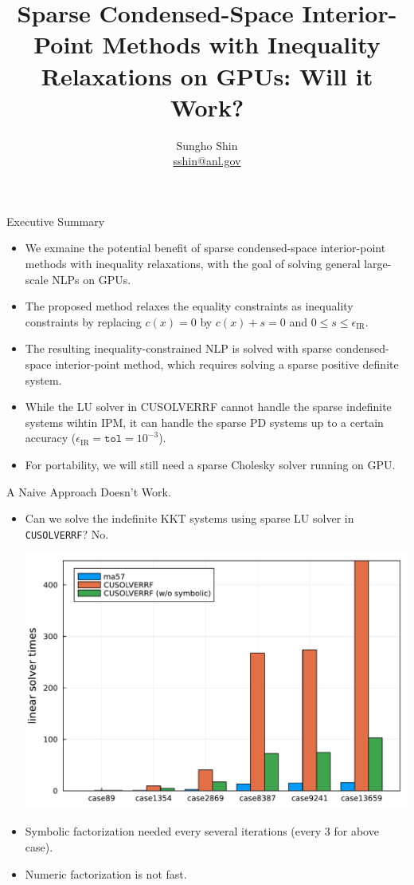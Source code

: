 % 

\title{{\bfseries Sparse Condensed-Space Interior-Point Methods with Inequality Relaxations on GPUs: Will it Work?}}

\graphicspath{}

\author[Sungho Shin]{
  Sungho Shin\\
  {\normalfont\footnotesize\url{sshin@anl.gov}}
}
\subtitle{}



{
}

\begin{frame}{Executive Summary}
  \begin{itemize}
  \item We exmaine the potential benefit of sparse condensed-space interior-point methods with inequality relaxations, with the goal of solving general large-scale NLPs on GPUs.
  \item The proposed method relaxes the equality constraints as inequality constraints by replacing $c(x) =0$ by $c(x)+ s=0$ and $0\leq s\leq\epsilon_{\text{IR}}$.
  \item The resulting inequality-constrained NLP is solved with sparse condensed-space interior-point method, which requires solving a sparse positive definite system.
  \item While the LU solver in CUSOLVERRF cannot handle the sparse indefinite systems wihtin IPM, it can handle the sparse PD systems up to a certain accuracy ($\epsilon_{\text{IR}}=\texttt{tol} = 10^{-3}$).
  \item For portability, we will still need a sparse Cholesky solver running on GPU.
  \end{itemize}
\end{frame}

\begin{frame}{A Naive Approach Doesn't Work.}
  \begin{itemize}
  \item Can we solve the indefinite KKT systems using sparse LU solver in \texttt{CUSOLVERRF}? No.
    \begin{center}
      \includegraphics[width=.5\textwidth]{../fig/linear_solvers.pdf}  
    \end{center}   
  \item Symbolic factorization needed every several iterations (every 3 for above case).
  \item Numeric factorization is not fast.
  \end{itemize}  
\end{frame}

